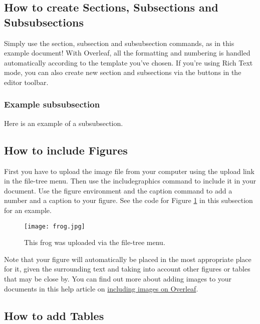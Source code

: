 \documentclass[12pt,a4paper,faculty=eb,language=en]{ugent-doc}
\begin{document}
\subsection{How to create Sections, Subsections and Subsubsections}

Simply use the section, subsection and subsubsection commands, as in this example document! With Overleaf, all the formatting and numbering is handled automatically according to the template you've chosen. If you're using Rich Text mode, you can also create new section and subsections via the buttons in the editor toolbar.

\subsubsection{Example subsubsection}

Here is an example of a subsubsection.


\subsection{How to include Figures}

First you have to upload the image file from your computer using the upload link in the file-tree menu. Then use the includegraphics command to include it in your document. Use the figure environment and the caption command to add a number and a caption to your figure. See the code for Figure \ref{fig:frog} in this subsection for an example.

\begin{figure}[h]
    \centering
    \texttt{[image: frog.jpg]}
    \caption{\label{fig:frog}This frog was uploaded via the file-tree menu.}
\end{figure}

Note that your figure will automatically be placed in the most appropriate place for it, given the surrounding text and taking into account other figures or tables that may be close by. You can find out more about adding images to your documents in this help article on \href{https://www.overleaf.com/learn/how-to/Including_images_on_Overleaf}{including images on Overleaf}.


\subsection{How to add Tables}
\end{document}
